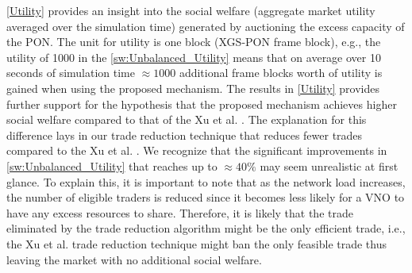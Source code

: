 \autoref{Utility} provides an insight into the social welfare (aggregate market utility averaged over the simulation time) generated by auctioning the excess capacity of the PON. The unit for utility is one block (XGS-PON frame block), e.g., the utility of 1000 in the \autoref{sw:Unbalanced_Utility} means that on average over 10 seconds of simulation time $\approx1000$ additional frame blocks worth of utility is gained when using the proposed mechanism. The results in \autoref{Utility} provides further support for the hypothesis that the proposed mechanism achieves higher social welfare compared to that of the Xu et al. \cite{5462277}. The explanation for this difference lays in our trade reduction technique that reduces fewer trades compared to the Xu et al. \cite{5462277}. We recognize that the significant improvements in \autoref{sw:Unbalanced_Utility} that reaches up to $\approx 40\%$ may seem unrealistic at first glance. To explain this, it is important to note that as the network load increases, the number of eligible traders is reduced since it becomes less likely for a \ac{VNO} to have any excess resources to share. Therefore, it is likely that the trade eliminated by the trade reduction algorithm might be the only efficient trade, i.e., the Xu et al. trade reduction technique might ban the only feasible trade thus leaving the market with no additional social welfare.


